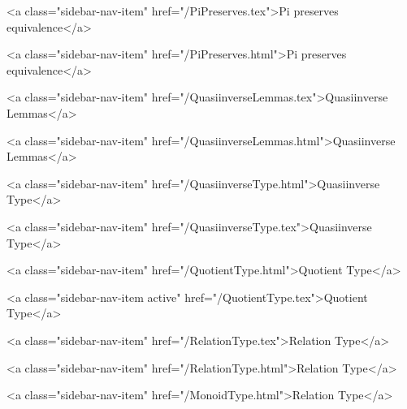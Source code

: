       
        
          <a class="sidebar-nav-item" href="/PiPreserves.tex">Pi preserves equivalence</a>
        
      
    
      
        
          <a class="sidebar-nav-item" href="/PiPreserves.html">Pi preserves equivalence</a>
        
      
    
      
        
          <a class="sidebar-nav-item" href="/QuasiinverseLemmas.tex">Quasiinverse Lemmas</a>
        
      
    
      
        
          <a class="sidebar-nav-item" href="/QuasiinverseLemmas.html">Quasiinverse Lemmas</a>
        
      
    
      
        
          <a class="sidebar-nav-item" href="/QuasiinverseType.html">Quasiinverse Type</a>
        
      
    
      
        
          <a class="sidebar-nav-item" href="/QuasiinverseType.tex">Quasiinverse Type</a>
        
      
    
      
        
          <a class="sidebar-nav-item" href="/QuotientType.html">Quotient Type</a>
        
      
    
      
        
          <a class="sidebar-nav-item active" href="/QuotientType.tex">Quotient Type</a>
        
      
    
      
        
          <a class="sidebar-nav-item" href="/RelationType.tex">Relation Type</a>
        
      
    
      
        
          <a class="sidebar-nav-item" href="/RelationType.html">Relation Type</a>
        
      
    
      
        
          <a class="sidebar-nav-item" href="/MonoidType.html">Relation Type</a>
        
